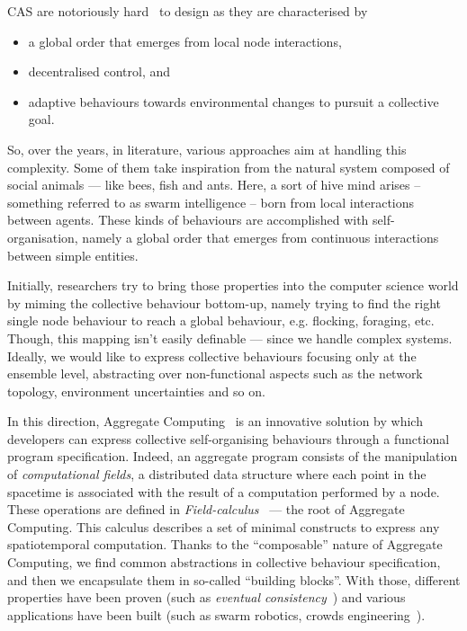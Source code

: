 \documentclass[conference]{IEEEtran}
\begin{document}
CAS are notoriously hard~\cite{DBLP:conf/huc/Ferscha15} to design as they are characterised by 
\begin{itemize}
\item a global order that emerges from local node interactions, 
\item decentralised control, and 
\item adaptive behaviours towards environmental changes to pursuit a collective goal.
\end{itemize} 
%
So, over the years, in literature, various approaches aim at handling this complexity. 
%
Some of them take inspiration from the natural system
 composed of social animals --- like bees, fish and ants. 
%
Here, a sort of hive mind arises -- 
 something referred to as swarm intelligence -- 
born from local interactions between agents. 
%
These kinds of behaviours are accomplished with self-organisation, 
 namely a global order that emerges from continuous 
 interactions between simple entities.

Initially, researchers try to bring those properties into the computer science world 
 by miming the collective behaviour bottom-up, 
 namely trying to find the right single node behaviour 
 to reach a global behaviour, e.g. flocking, foraging, etc.
%
Though, this mapping isn't easily definable ---
 since we handle complex systems.
%
Ideally, we would like to express collective behaviours focusing only at the ensemble level,
 abstracting over non-functional aspects such as the network topology, environment uncertainties and 
 so on.

In this direction, Aggregate Computing~\cite{DBLP:journals/computer/BealPV15} is an innovative solution by which 
 developers can express collective self-organising behaviours through a functional program specification.
%
Indeed, an aggregate program consists of the manipulation of \textit{computational fields}, a distributed
 data structure where each point in the spacetime is associated with the result of a computation
 performed by a node.
%
These operations are defined in \textit{Field-calculus}~\cite{DBLP:conf/coordination/AudritoBDV18} --- the root of Aggregate Computing. 
 This calculus describes a set of minimal constructs to express any spatiotemporal computation.
%
Thanks to the ``composable'' nature of Aggregate Computing, we find common abstractions 
 in collective behaviour specification, and then we encapsulate them in so-called ``building blocks''.
%
With those, different properties have been proven (such as \textit{eventual consistency}~\cite{DBLP:journals/taas/BealVPD17}) and various
 applications have been built (such as swarm robotics, crowds engineering~\cite{DBLP:journals/eaai/CasadeiVAPD21}).
\end{document}
